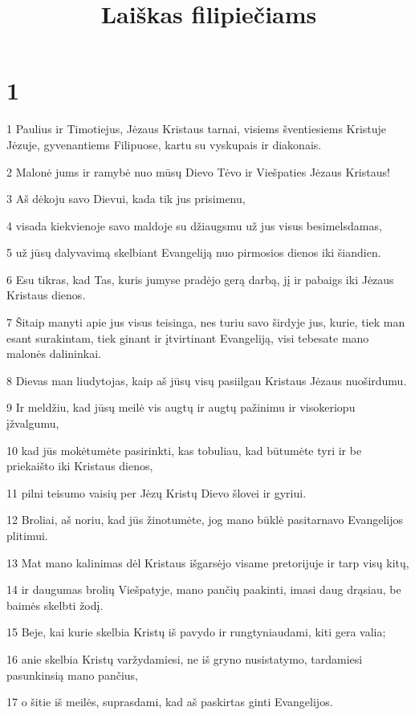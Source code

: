 

\title{Laiškas filipiečiams}

\chapter{1}


\par 1 Paulius ir Timotiejus, Jėzaus Kristaus tarnai, visiems šventiesiems Kristuje Jėzuje, gyvenantiems Filipuose, kartu su vyskupais ir diakonais. 
\par 2 Malonė jums ir ramybė nuo mūsų Dievo Tėvo ir Viešpaties Jėzaus Kristaus! 
\par 3 Aš dėkoju savo Dievui, kada tik jus prisimenu, 
\par 4 visada kiekvienoje savo maldoje su džiaugsmu už jus visus besimelsdamas, 
\par 5 už jūsų dalyvavimą skelbiant Evangeliją nuo pirmosios dienos iki šiandien. 
\par 6 Esu tikras, kad Tas, kuris jumyse pradėjo gerą darbą, jį ir pabaigs iki Jėzaus Kristaus dienos. 
\par 7 Šitaip manyti apie jus visus teisinga, nes turiu savo širdyje jus, kurie, tiek man esant surakintam, tiek ginant ir įtvirtinant Evangeliją, visi tebesate mano malonės dalininkai. 
\par 8 Dievas man liudytojas, kaip aš jūsų visų pasiilgau Kristaus Jėzaus nuoširdumu. 
\par 9 Ir meldžiu, kad jūsų meilė vis augtų ir augtų pažinimu ir visokeriopu įžvalgumu, 
\par 10 kad jūs mokėtumėte pasirinkti, kas tobuliau, kad būtumėte tyri ir be priekaišto iki Kristaus dienos, 
\par 11 pilni teisumo vaisių per Jėzų Kristų Dievo šlovei ir gyriui. 
\par 12 Broliai, aš noriu, kad jūs žinotumėte, jog mano būklė pasitarnavo Evangelijos plitimui. 
\par 13 Mat mano kalinimas dėl Kristaus išgarsėjo visame pretorijuje ir tarp visų kitų, 
\par 14 ir daugumas brolių Viešpatyje, mano pančių paakinti, imasi daug drąsiau, be baimės skelbti žodį. 
\par 15 Beje, kai kurie skelbia Kristų iš pavydo ir rungtyniaudami, kiti gera valia; 
\par 16 anie skelbia Kristų varžydamiesi, ne iš gryno nusistatymo, tardamiesi pasunkinsią mano pančius, 
\par 17 o šitie iš meilės, suprasdami, kad aš paskirtas ginti Evangelijos. 
